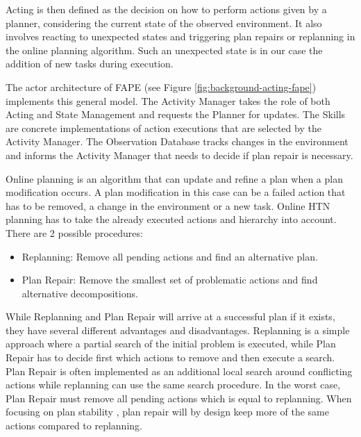Acting is then defined as the decision on how to perform actions given by a planner, considering the current state of the observed environment.
It also involves reacting to unexpected states and triggering plan repairs or replanning in the online planning algorithm.
Such an unexpected state is in our case the addition of new tasks during execution.

The actor architecture of FAPE (see Figure \ref{fig:background-acting-fape}) implements this general model.
The Activity Manager takes the role of both Acting and State Management and requests the Planner for updates.
The Skills are concrete implementations of action executions that are selected by the Activity Manager.
The Observation Database tracks changes in the environment and informs the Activity Manager that needs to decide if plan repair is necessary.





Online planning is an algorithm that can update and refine a plan when a plan modification occurs.
A plan modification in this case can be a failed action that has to be removed, a change in the environment or a new task.
Online HTN planning has to take the already executed actions and hierarchy into account.
There are 2 possible procedures:
\begin{itemize}
  \item Replanning: Remove all pending actions and find an alternative plan.
  \item Plan Repair: Remove the smallest set of problematic actions and find alternative decompositions.
\end{itemize}

While Replanning and Plan Repair will arrive at a successful plan if it exists, they have several different advantages and disadvantages.
Replanning is a simple approach where a partial search of the initial problem is executed, while Plan Repair has to decide first which actions to remove and then execute a search.
Plan Repair is often implemented as an additional local search around conflicting actions \citep{bajadaTemporalPlanQuality2014} while replanning can use the same search procedure.
In the worst case, Plan Repair must remove all pending actions which is equal to replanning.
When focusing on plan stability \citep{foxPlanStabilityReplanning2006}, plan repair will by design keep more of the same actions compared to replanning.

